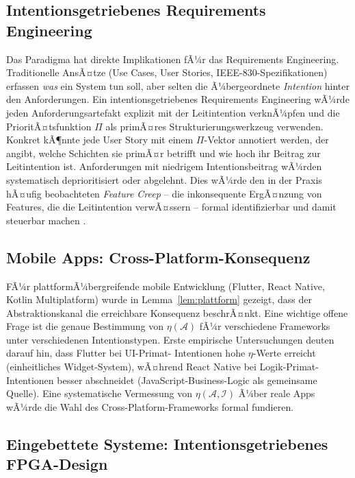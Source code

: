 ﻿\documentclass[a4paper,12pt]{article}
\theoremstyle{definition}
\begin{document}
\subsection{Intentionsgetriebenes Requirements Engineering}

Das Paradigma hat direkte Implikationen fÃ¼r das Requirements Engineering.
Traditionelle AnsÃ¤tze (Use Cases, User Stories, IEEE-830-Spezifikationen)
erfassen \emph{was} ein System tun soll, aber selten die Ã¼bergeordnete
\emph{Intention} hinter den Anforderungen. Ein intentionsgetriebenes
Requirements Engineering wÃ¼rde jeden Anforderungsartefakt explizit mit
der Leitintention verknÃ¼pfen und die PrioritÃ¤tsfunktion $\Pi$ als
primÃ¤res Strukturierungswerkzeug verwenden. Konkret kÃ¶nnte jede User
Story mit einem $\Pi$-Vektor annotiert werden, der angibt, welche
Schichten sie primÃ¤r betrifft und wie hoch ihr Beitrag zur Leitintention
ist. Anforderungen mit niedrigem Intentionsbeitrag wÃ¼rden systematisch
deprioritisiert oder abgelehnt. Dies wÃ¼rde den in der Praxis hÃ¤ufig
beobachteten \emph{Feature Creep} -- die inkonsequente ErgÃ¤nzung von
Features, die die Leitintention verwÃ¤ssern -- formal identifizierbar
und damit steuerbar machen \cite{jacobson1992objectoriented}.

\subsection{Mobile Apps: Cross-Platform-Konsequenz}

FÃ¼r plattformÃ¼bergreifende mobile Entwicklung (Flutter, React Native,
Kotlin Multiplatform) wurde in Lemma~\ref{lem:plattform} gezeigt, dass
der Abstraktionskanal die erreichbare Konsequenz beschrÃ¤nkt. Eine
wichtige offene Frage ist die genaue Bestimmung von $\eta(\mathcal{A})$
fÃ¼r verschiedene Frameworks unter verschiedenen Intentionstypen. Erste
empirische Untersuchungen deuten darauf hin, dass Flutter bei UI-Primat-
Intentionen hohe $\eta$-Werte erreicht (einheitliches Widget-System),
wÃ¤hrend React Native bei Logik-Primat-Intentionen besser abschneidet
(JavaScript-Business-Logic als gemeinsame Quelle). Eine systematische
Vermessung von $\eta(\mathcal{A}, \mathcal{I})$ Ã¼ber reale Apps wÃ¼rde
die Wahl des Cross-Platform-Frameworks formal fundieren.

\subsection{Eingebettete Systeme: Intentionsgetriebenes FPGA-Design}
\end{document}
